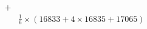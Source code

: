 \documentclass[preview]{standalone}
\begin{document}
\begin{align*}
+&\\&\frac{1}{6}\times(16833+4\times16835+17065)
\end{align*}
\end{document}
